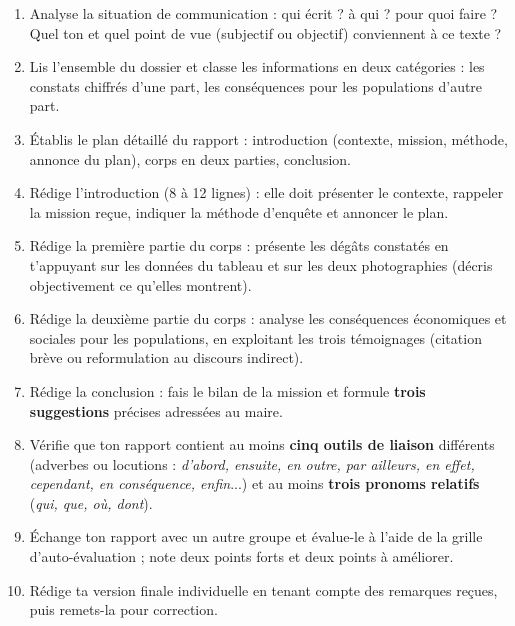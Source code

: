 \documentclass[11pt]{article}
\newcommand{\cle}[1]{{\popxbold\color{popdark}#1}}
\newcounter{popsec}
\newcounter{popsub}
\newcommand{\courssub}[1]{%
  \stepcounter{popsub}%
  \par\vspace{9pt}\noindent{\popxbold\fontsize{11.5}{13}\selectfont\color{popink}{\color{poporange}\thepopsec.\thepopsub}\hspace{6pt}#1}\par\nopagebreak\vspace{4pt}
}
\begin{document}
\begin{enumerate}
\item Analyse la situation de communication : qui écrit ? à qui ? pour quoi faire ? Quel ton et quel point de vue (subjectif ou objectif) conviennent à ce texte ?
\item Lis l'ensemble du dossier et classe les informations en deux catégories : les \cle{constats chiffrés} d'une part, les \cle{conséquences pour les populations} d'autre part.
\item Établis le plan détaillé du rapport : introduction (contexte, mission, méthode, annonce du plan), corps en deux parties, conclusion.
\item Rédige l'\cle{introduction} (8 à 12 lignes) : elle doit présenter le contexte, rappeler la mission reçue, indiquer la méthode d'enquête et annoncer le plan.
\item Rédige la \cle{première partie} du corps : présente les dégâts constatés en t'appuyant sur les données du tableau et sur les deux photographies (décris objectivement ce qu'elles montrent).
\item Rédige la \cle{deuxième partie} du corps : analyse les conséquences économiques et sociales pour les populations, en exploitant les trois témoignages (citation brève ou reformulation au discours indirect).
\item Rédige la \cle{conclusion} : fais le bilan de la mission et formule \textbf{trois suggestions} précises adressées au maire.
\item Vérifie que ton rapport contient au moins \textbf{cinq outils de liaison} différents (adverbes ou locutions : \emph{d'abord, ensuite, en outre, par ailleurs, en effet, cependant, en conséquence, enfin}...) et au moins \textbf{trois pronoms relatifs} (\emph{qui, que, où, dont}).
\item Échange ton rapport avec un autre groupe et évalue-le à l'aide de la grille d'auto-évaluation ; note deux points forts et deux points à améliorer.
\item Rédige ta version finale individuelle en tenant compte des remarques reçues, puis remets-la pour correction.
\end{enumerate}

\courssub{Ressources à mobiliser}
\end{document}
